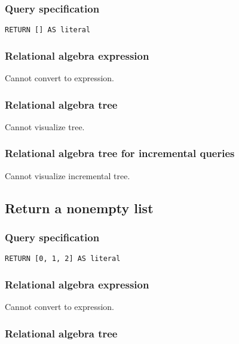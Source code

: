 \subsubsection*{Query specification}

\begin{lstlisting}
RETURN [] AS literal
\end{lstlisting}

\subsubsection*{Relational algebra expression}

Cannot convert to expression.

\subsubsection*{Relational algebra tree}

Cannot visualize tree.

\subsubsection*{Relational algebra tree for incremental queries}

Cannot visualize incremental tree.

\subsection{Return a nonempty list}

\subsubsection*{Query specification}

\begin{lstlisting}
RETURN [0, 1, 2] AS literal
\end{lstlisting}

\subsubsection*{Relational algebra expression}

Cannot convert to expression.

\subsubsection*{Relational algebra tree}

